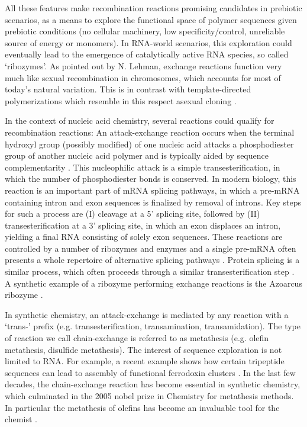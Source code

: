 \documentclass[
	amsmath,
	amssymb,
	a4paper,
	aip,		%
	jcp,		%
	reprint, twocolumn  %
	fleqn,
	showpacs,
	floatfix
]{revtex4-1}
\begin{document}
All these features make recombination reactions promising candidates in prebiotic scenarios, 
as a means to explore the functional space of polymer sequences given prebiotic conditions (no cellular machinery, low specificity/control, unreliable source of energy or monomers).
In RNA-world scenarios, this exploration could eventually lead to the emergence of catalytically active RNA species, so called `ribozymes'. 
As pointed out by N. Lehman, exchange reactions function very much like sexual recombination in chromosomes, 
which accounts for most of today's natural variation. This is in contrast with template-directed polymerizations which resemble  
in this respect asexual cloning \cite{Lehman2003}. 


In the context of nucleic acid chemistry, several reactions could qualify for recombination reactions: An attack-exchange reaction occurs when the terminal hydroxyl group (possibly modified) of one nucleic 
acid attacks a phosphodiester group of another nucleic acid polymer and is typically aided by sequence complementarity \cite{Nechaev2009} \cite{Lehman2008}.  
This nucleophilic attack is a simple transesterification, in which the number of phosphodiester bonds is conserved. In modern biology, this reaction is an important part of mRNA splicing pathways, in which a pre-mRNA containing intron and exon sequences is finalized by removal of introns. Key steps for such a process are (I) cleavage at a 5' splicing site, followed by (II) transesterification at a 3' splicing site, in which an exon displaces an intron, yielding a final RNA consisting of solely exon sequences. These reactions are controlled by a number of ribozymes and enzymes and a single pre-mRNA often presents a whole repertoire of alternative splicing pathways \cite{Lee2015}.  
Protein splicing is a similar process, which often proceeds through a similar transesterification step \cite{Shao1997}. A synthetic example of a ribozyme performing exchange reactions is the Azoarcus ribozyme \cite{Vaidya2012}. 

In synthetic chemistry, an attack-exchange is mediated by any reaction with a `trans-' prefix 
(e.g. transesterification, transamination, transamidation). The type of reaction we call chain-exchange is 
referred to as metathesis (e.g. olefin metathesis, disulfide metathesis). 
The interest of sequence exploration is not limited to RNA. For example, a recent example shows how certain tripeptide 
sequences can lead to assembly of functional ferrodoxin clusters \cite{Bonfio2017}.
In the last few decades, the chain-exchange reaction has become essential in synthetic chemistry, 
which culminated in the 2005 nobel prize in Chemistry for metathesis methods. In particular the metathesis of olefins 
has become an invaluable tool for the chemist \cite{Hoveyda2007}. 
\end{document}
